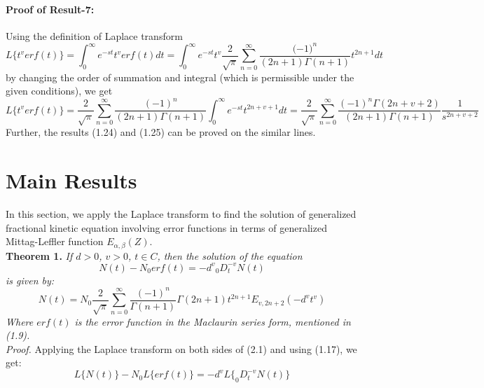 \documentclass[leqno]{article}
\begin{document}
\paragraph{Proof of Result-7:}
Using the definition of Laplace transform
\begin{equation*}
    L \big\{ {t^v}erf(t) \big\}=
    \int_0^{\infty}
    e ^{-st}{t^v}erf(t)dt = 
    \int_0^{\infty}
    e ^{-st}t^{v}
    \frac{2}{\sqrt{\pi}}
    \sum_{n = 0}^{\infty}
    \frac{({-1)}^n}{(2n+1)\Gamma{(n+1)}}
    t^{2n+1}dt
\end{equation*}
by changing the order of summation and integral (which is permissible under the given conditions), we get
\begin{equation*}
    L \big\{{t^v} erf(t) \big\}=
    \frac{2}{\sqrt{\pi}}
    \sum_{n = 0}^{\infty}
    \frac{{(-1)}^n}{(2n+1)\Gamma{(n+1)}}
    \int_0^{\infty}
    e ^{-st}t^{2n+v+1}dt =
    \frac{2}{\sqrt{\pi}}
    \sum_{n = 0}^{\infty}
    \frac{{(-1)}^n\Gamma{(2n+v+2)}}{(2n+1)\Gamma{(n+1)}}
    \frac{1}{s^{2n+v+2}}
\end{equation*}
Further, the results (1.24) and (1.25) can be proved on the similar lines.

\section{Main Results}
In this section, we apply the Laplace transform to find the solution of generalized fractional kinetic equation involving error functions in terms of generalized Mittag-Leffler function $E_{{\alpha}, {\beta}}(Z)$.\\
\noindent
{\bf Theorem 1.}
{\it If $d > 0$, $v > 0$, $t \in C$, then the solution of the equation
\begin{equation}
    N(t) - N_0erf(t) = {-d^v}{_0D_t^{-v}}N(t)
\end{equation}
is given by:
\begin{equation}
    N(t) = N_0
    \frac{2}{\sqrt{\pi}}\sum_{n = 0}^{\infty}
    \frac{(-1)^n}{\Gamma{(n+1)}}
    \Gamma{(2n+1)}t^{2n+1}
    E_{v,2n+2}
    ({-d^v}{t^v})
\end{equation}
Where $erf(t)$ is the error function in the Maclaurin series form, mentioned in (1.9).}
\vspace{0.05in}\\ 
\noindent
{\it Proof.}
Applying the Laplace transform on both sides of (2.1) and using (1.17), we get:
\begin{equation*}
    L\big\{ N(t) \big\} - N_0L\{erf(t)\}=
    {-d^v}L\{_0D_t^{-v}N(t)\}
\end{equation*}
\end{document}
